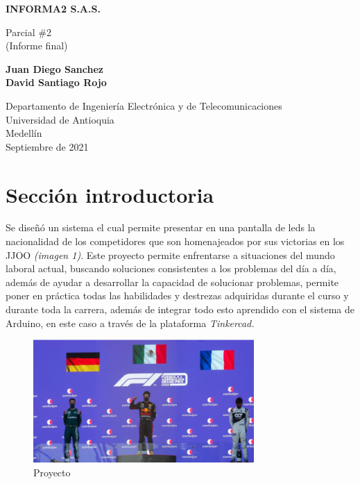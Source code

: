 \documentclass{article}
\begin{document}
\begin{titlepage}
    \begin{center}
        \vspace*{1cm}
            
        \Huge
        \textbf{INFORMA2 S.A.S.}
            
        \vspace{0.5cm}
        \LARGE
        Parcial \#2\\ (Informe final)
            
        \vspace{1.5cm}
            
        \textbf{Juan Diego Sanchez\\
                David Santiago Rojo}
            
        \vfill
            
        \vspace{0.8cm}
            
        \Large
        Departamento de Ingeniería Electrónica y de Telecomunicaciones\\
        Universidad de Antioquia\\
        Medellín\\
        Septiembre de 2021
            
    \end{center}
\end{titlepage}

\tableofcontents
\newpage

\section{Sección introductoria}\label{intro}
Se diseñó un sistema el cual permite presentar en una pantalla de leds la nacionalidad de los competidores que son homenajeados por sus victorias en los JJOO \textit{(imagen 1)}. Este proyecto permite enfrentarse a situaciones del mundo laboral actual, buscando soluciones consistentes a los problemas del día a día, además de ayudar a desarrollar la capacidad de solucionar problemas, permite poner en práctica todas las habilidades y destrezas adquiridas durante el curso y durante toda la carrera, además de integrar todo esto aprendido con el sistema de Arduino, en este caso a través de la plataforma \textit{Tinkercad.}

\begin{figure}[htb]
    \centering
    \includegraphics[width=0.75\textwidth]{ideal.png}
    \caption{Proyecto}
    \label{fig:circuito_funcionando}
\end{figure}
\end{document}
